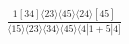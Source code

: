 \documentclass[varwidth, border=5pt]{standalone}
\begin{document}
\begin{my}
$\begin{gathered}
\scriptscriptstyle\frac{1[34]⟨23⟩⟨45⟩⟨24⟩[45]}{⟨15⟩⟨23⟩⟨34⟩⟨45⟩⟨4|1+5|4]}
\end{gathered}$
\end{my}
\end{document}
